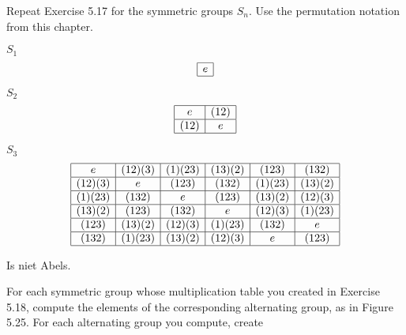 \begin{questions}
	\question Repeat Exercise 5.17 for the symmetric groups $S_n$. Use the permutation notation from this chapter.
	\begin{solution}
		\par $S_1$
		\[
			\begin{array}{|c|}
			\hline
			e\\
			\hline
			\end{array}
		\]
		\par $S_2$
		\[
			\begin{array}{|c|c|}
			\hline
			e& (1 2)\\
			\hline
			(1 2) & e\\
			\hline
			\end{array}
		\]
		\par $S_3$
		\[
			\begin{array}{|c|c|c|c|c|c|}
			\hline
			e& (1 2)(3) & (1)(2 3) & (1 3)(2) & (1 2 3) & (1 3 2)\\
			\hline
			(1 2)(3) & e & (123) & (132) & (1)(23)&(13)(2) \\
			\hline
			(1)(23) & (132) & e & (123) & (13)(2) & (12)(3)\\
			\hline
			(13)(2) & (123) & (132) & e & (12)(3) & (1)(23)\\
			\hline
			(123) & (13)(2) & (12)(3) & (1)(23) & (132) & e\\
			\hline
			(132) & (1)(23) & (13)(2) & (12)(3) & e & (123)\\
			\hline
			\end{array}
		\]
		\par Is niet Abels.
	\end{solution}

	\question For each symmetric group whose multiplication table you created in Exercise 5.18, compute the elements of the corresponding alternating group, as in Figure 5.25. For each alternating group you compute, create
\end{questions}
